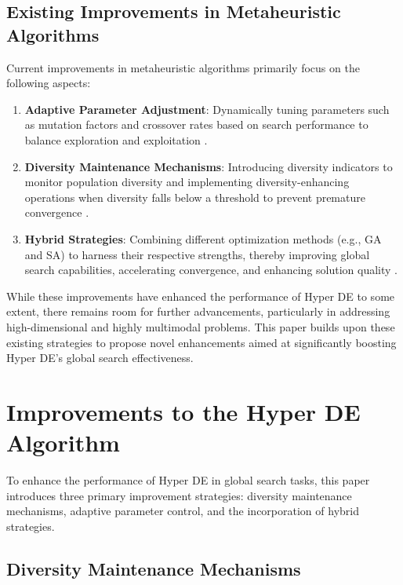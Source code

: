 \documentclass[conference]{IEEEtran}
\begin{document}
\subsection{Existing Improvements in Metaheuristic Algorithms}

Current improvements in metaheuristic algorithms primarily focus on the following aspects:

\begin{enumerate}
    \item \textbf{Adaptive Parameter Adjustment}: Dynamically tuning parameters such as mutation factors and crossover rates based on search performance to balance exploration and exploitation \cite{burke2013hyper, grobler2010alternative}.
    \item \textbf{Diversity Maintenance Mechanisms}: Introducing diversity indicators to monitor population diversity and implementing diversity-enhancing operations when diversity falls below a threshold to prevent premature convergence \cite{burke2013hyper, grobler2010alternative}.
    \item \textbf{Hybrid Strategies}: Combining different optimization methods (e.g., GA and SA) to harness their respective strengths, thereby improving global search capabilities, accelerating convergence, and enhancing solution quality \cite{burke2013hyper, grobler2010alternative}.
\end{enumerate}

While these improvements have enhanced the performance of Hyper DE to some extent, there remains room for further advancements, particularly in addressing high-dimensional and highly multimodal problems. This paper builds upon these existing strategies to propose novel enhancements aimed at significantly boosting Hyper DE's global search effectiveness.

\section{Improvements to the Hyper DE Algorithm}

To enhance the performance of Hyper DE in global search tasks, this paper introduces three primary improvement strategies: diversity maintenance mechanisms, adaptive parameter control, and the incorporation of hybrid strategies.

\subsection{Diversity Maintenance Mechanisms}
\end{document}
